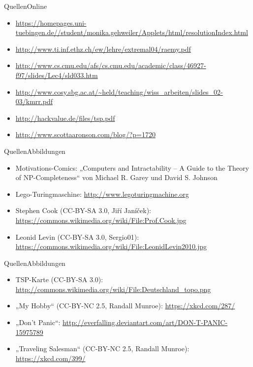 \documentclass[ignorenonframetext,]{beamer}
\begin{document}
\begin{frame}{Quellen}{Online}
\begin{itemize}
	\item \url{https://homepages.uni-tuebingen.de//student/monika.gehweiler/Applets/html/resolutionIndex.html}
	\item \url{http://www.ti.inf.ethz.ch/ew/lehre/extremal04/raemy.pdf}
	\item \url{http://www.cs.cmu.edu/afs/cs.cmu.edu/academic/class/46927-f97/slides/Lec4/sld033.htm}
	\item \url{http://www.cosy.sbg.ac.at/~held/teaching/wiss\_arbeiten/slides\_02-03/kmrr.pdf}
	\item \url{http://hackvalue.de/files/tsp.pdf}
	\item \url{http://www.scottaaronson.com/blog/?p=1720}
\end{itemize}
\end{frame}

\begin{frame}{Quellen}{Abbildungen}
\begin{itemize}
	\item Motivations-Comics: „Computers and Intractability -- A Guide to the Theory of NP-Completeness“ von Michael R. Garey und David S. Johnson
	\item Lego-Turingmaschine: \url{http://www.legoturingmachine.org}
	\item Stephen Cook (CC-BY-SA 3.0, Jiří Janíček):
		\url{https://commons.wikimedia.org/wiki/File:Prof.Cook.jpg}
	\item Leonid Levin (CC-BY-SA 3.0, Sergio01):
		\url{https://commons.wikimedia.org/wiki/File:LeonidLevin2010.jpg}
\end{itemize}
\end{frame}

\begin{frame}{Quellen}{Abbildungen}
\begin{itemize}
	\item TSP-Karte (CC-BY-SA 3.0): \url{http://commons.wikimedia.org/wiki/File:Deutschland_topo.png}
	\item „My Hobby“ (CC-BY-NC 2.5, Randall Munroe): \url{https://xkcd.com/287/}
	\item „Don't Panic“: \url{http://everfalling.deviantart.com/art/DON-T-PANIC-15975789}
	\item „Traveling Salesman“ (CC-BY-NC 2.5, Randall Munroe): \url{https://xkcd.com/399/}
\end{itemize}
\end{frame}
\end{document}
